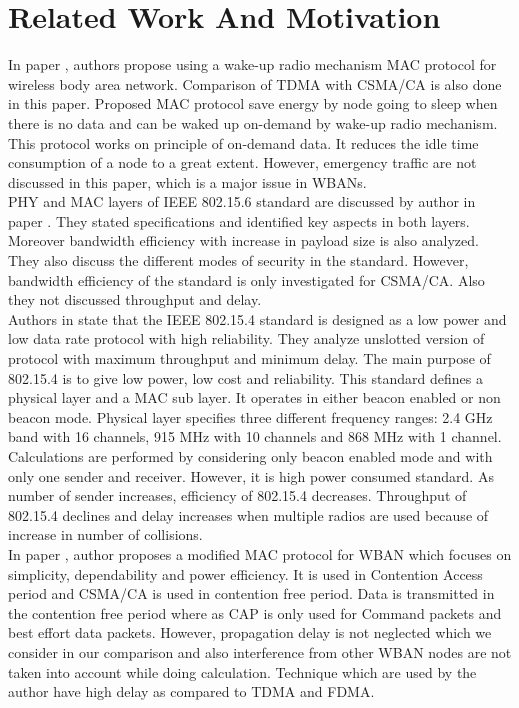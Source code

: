 \documentclass[11pt, conference, compsocconf, onecolumn]{IEEEtran}
\begin{document}
\section{Related Work And Motivation}
\indent In paper \cite{1}, authors propose using a wake-up radio mechanism MAC protocol for wireless body area network. Comparison of TDMA with CSMA/CA is also done in this paper. Proposed MAC protocol save energy by node going to sleep when there is no data and can be waked up on-demand by wake-up radio mechanism. This protocol works on principle of on-demand data. It reduces the idle time consumption of a node to a great extent. However, emergency traffic are not discussed in this paper, which is a major issue in WBANs.\\

\indent PHY and MAC layers of IEEE 802.15.6 standard are discussed by author in paper \cite{8}. They stated specifications and identified key aspects in both layers. Moreover bandwidth efficiency with increase in payload size is also analyzed. They also discuss the different modes of security in the standard. However, bandwidth efficiency of the standard is only investigated for CSMA/CA. Also they not discussed throughput and delay.\\

\indent Authors in \cite{3} state that the IEEE 802.15.4 standard is designed as a low power and low data rate protocol with high reliability. They analyze unslotted version of protocol with maximum throughput and minimum delay. The main purpose of 802.15.4 is to give low power, low cost and reliability. This standard defines a physical layer and a MAC sub layer. It operates in either beacon enabled or non beacon mode. Physical layer specifies three different frequency ranges: 2.4 GHz band with 16 channels, 915 MHz with 10 channels and 868 MHz with 1 channel. Calculations are performed by considering only beacon enabled mode and with only one sender and receiver. However, it is high power consumed standard. As number of sender increases, efficiency of 802.15.4 decreases. Throughput of 802.15.4 declines and delay increases when multiple radios are used because of increase in number of collisions.\\

\indent In paper \cite{9}, author proposes a modified MAC protocol for WBAN which focuses on simplicity, dependability and power efficiency. It is used in Contention Access period and CSMA/CA is used in contention free period. Data is transmitted in the contention free period where as CAP is only used for Command packets and best effort data packets. However, propagation delay is not neglected which we consider in our comparison and also interference from other WBAN nodes are not taken into account while doing calculation. Technique which are used by the author have high delay as compared to TDMA and FDMA.\\
\end{document}
